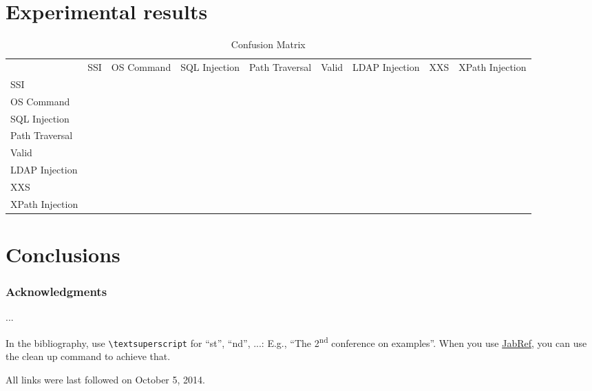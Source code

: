 \documentclass[runningheads,a4paper]{llncs}
\begin{document}
\section{Experimental results}



\begin{table}[]
\centering
\caption{Confusion Matrix}
\label{ConfusionMatrix}
\begin{tabular}{lllllllll}
                & SSI & OS Command & SQL Injection & Path Traversal & Valid & LDAP Injection & XXS & XPath Injection \\
SSI             &     &            &               &                &       &                &     &                 \\
OS Command      &     &            &               &                &       &                &     &                 \\
SQL Injection   &     &            &               &                &       &                &     &                 \\
Path Traversal  &     &            &               &                &       &                &     &                 \\
Valid           &     &            &               &                &       &                &     &                 \\
LDAP Injection  &     &            &               &                &       &                &     &                 \\
XXS             &     &            &               &                &       &                &     &                 \\
XPath Injection &     &            &               &                &       &                &     &                
\end{tabular}
\end{table}

\section{Conclusions}


\subsubsection*{Acknowledgments}
...

In the bibliography, use \texttt{\textbackslash textsuperscript} for ``st'', ``nd'', ...:
E.g., \enquote{The 2\textsuperscript{nd} conference on examples}.
When you use \href{http://www.jabref.org}{JabRef}, you can use the clean up command to achieve that.




All links were last followed on October 5, 2014.
\end{document}
